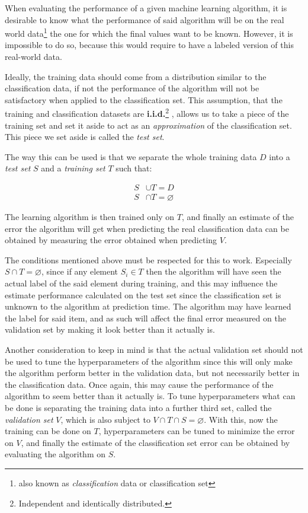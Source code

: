 \documentclass[epsfig,a4paper,11pt,titlepage,twoside,openany]{book}
\begin{document}
When evaluating the performance of a given machine learning algorithm, it is desirable to know what the performance of said algorithm will be on the real world data\footnote{also known as \textit{classification} data or classification set} the one for which the final values want to be known. However, it is impossible to do so, because this would require to have a labeled version of this real-world data. 

Ideally, the training data should come from a distribution similar to the classification data, if not the performance of the algorithm will not be satisfactory when applied to the classification set. This assumption, that the training and classification datasets are \textbf{i.i.d.}\footnote{Independent and identically distributed.} \cite{clauset2011brief}, allows us to take a piece of the training set and set it aside to act as an \textit{approximation} of the classification set. This piece we set aside is called the \textit{test set}. 

The way this can be used is that we separate the whole training data $D$ into a \textit{test set} $S$ and a \textit{training set} $T$ such that:

\begin{align*}
    S &\cup T = D \\ 
    S &\cap T = \varnothing
\end{align*}

The learning algorithm is then trained only on $T$, and finally an estimate of the error the algorithm will get when predicting the real classification data can be obtained by measuring the error obtained when predicting $V$. 

The conditions mentioned above must be respected for this to work. Especially $S \cap T = \varnothing$, since if any element $S_i \in T$ then the algorithm will have seen the actual label of the said element during training, and this may influence the estimate performance calculated on the test set since the classification set is unknown to the algorithm at prediction time. The algorithm may have learned the label for said item, and as such will affect the final error measured on the validation set by making it look better than it actually is.

Another consideration to keep in mind is that the actual validation set should not be used to tune the hyperparameters of the algorithm since this will only make the algorithm perform better in the validation data, but not necessarily better in the classification data. Once again, this may cause the performance of the algorithm to seem better than it actually is. To tune hyperparameters what can be done is separating the training data into a further third set, called the \textit{validation set} $V$, which is also subject to $V \cap T \cap S = \varnothing$. With this, now the training can be done on $T$, hyperparameters can be tuned to minimize the error on $V$, and finally the estimate of the classification set error can be obtained by evaluating the algorithm on $S$.
\end{document}
